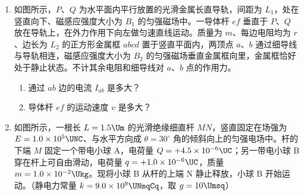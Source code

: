 \documentclass[\gkver]{gaokaozhenti}
\begin{document}
\begin{enumerate}

\item
如图所示，$P$、$Q$ 为水平面内平行放置的光滑金属长直导轨，间距为 $L_{1}$，处在竖直向下、磁感应强度大小为 $B_{1}$ 的匀强磁场中。一导体杆 $ef$ 垂直于 $P$、$Q$ 放在导轨上，在外力作用下向左做匀速直线运动。质量为 $m$、每边电阻均为 $r$、边长为 $L_{2}$ 的正方形金属框 $abcd$ 置于竖直平面内，两顶点 $a$、$b$ 通过细导线与导轨相连，磁感应强度大小为 $B_{2}$ 的匀强磁场垂直金属框向里，金属框恰好处于静止状态。不计其余电阻和细导线对 $a$、$b$ 点的作用力。

\begin{enumerate}
	\item
	通过 $ab$ 边的电流 $I_{ab}$ 是多大？
	\item
	导体杆 $ef$ 的运动速度 $v$ 是多大？
\end{enumerate}




\item
如图所示，一根长 $L=1.5\Um$ 的光滑绝缘细直杆 $MN$，竖直固定在场强为 $E=1.0\times10^{5}\UNC$、与水平方向成 $\theta=30^{\circ}$ 角的倾斜向上的匀强电场中。杆的下端 $M$ 固定一个带电小球 A，电荷量 $Q=+4.5\times10^{-6}\UC$；另一带电小球 B 穿在杆上可自由滑动，电荷量 $q=+1.0\times10^{-6}\UC$，质量 $m=1.0\times10^{-2}\Ukg$。现将小球 B 从杆的上端 N 静止释放，小球 B 开始运动。（静电力常量 $k=9.0\times10^{9}\UNmqCq$，取 $g=10\Umsq$）


\end{enumerate}
\end{document}
